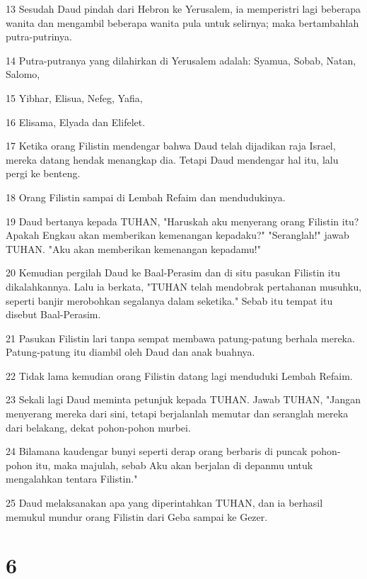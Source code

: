 \par 13 Sesudah Daud pindah dari Hebron ke Yerusalem, ia memperistri lagi beberapa wanita dan mengambil beberapa wanita pula untuk selirnya; maka bertambahlah putra-putrinya.
\par 14 Putra-putranya yang dilahirkan di Yerusalem adalah: Syamua, Sobab, Natan, Salomo,
\par 15 Yibhar, Elisua, Nefeg, Yafia,
\par 16 Elisama, Elyada dan Elifelet.
\par 17 Ketika orang Filistin mendengar bahwa Daud telah dijadikan raja Israel, mereka datang hendak menangkap dia. Tetapi Daud mendengar hal itu, lalu pergi ke benteng.
\par 18 Orang Filistin sampai di Lembah Refaim dan mendudukinya.
\par 19 Daud bertanya kepada TUHAN, "Haruskah aku menyerang orang Filistin itu? Apakah Engkau akan memberikan kemenangan kepadaku?" "Seranglah!" jawab TUHAN. "Aku akan memberikan kemenangan kepadamu!"
\par 20 Kemudian pergilah Daud ke Baal-Perasim dan di situ pasukan Filistin itu dikalahkannya. Lalu ia berkata, "TUHAN telah mendobrak pertahanan musuhku, seperti banjir merobohkan segalanya dalam seketika." Sebab itu tempat itu disebut Baal-Perasim.
\par 21 Pasukan Filistin lari tanpa sempat membawa patung-patung berhala mereka. Patung-patung itu diambil oleh Daud dan anak buahnya.
\par 22 Tidak lama kemudian orang Filistin datang lagi menduduki Lembah Refaim.
\par 23 Sekali lagi Daud meminta petunjuk kepada TUHAN. Jawab TUHAN, "Jangan menyerang mereka dari sini, tetapi berjalanlah memutar dan seranglah mereka dari belakang, dekat pohon-pohon murbei.
\par 24 Bilamana kaudengar bunyi seperti derap orang berbaris di puncak pohon-pohon itu, maka majulah, sebab Aku akan berjalan di depanmu untuk mengalahkan tentara Filistin."
\par 25 Daud melaksanakan apa yang diperintahkan TUHAN, dan ia berhasil memukul mundur orang Filistin dari Geba sampai ke Gezer.

\chapter{6}

